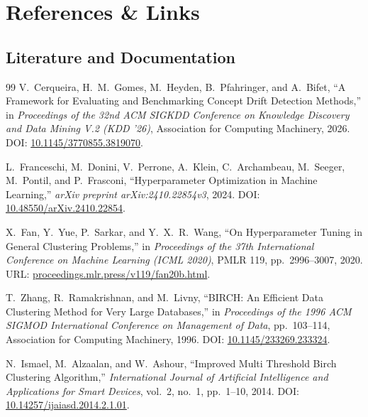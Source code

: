 \section{References \& Links}

\subsection*{Literature and Documentation}
\begin{thebibliography}{99}
\small
{}
V.~Cerqueira, H.~M.~Gomes, M.~Heyden, B.~Pfahringer, and A.~Bifet,
\newblock ``A Framework for Evaluating and Benchmarking Concept Drift Detection Methods,''
\newblock in \emph{Proceedings of the 32nd ACM SIGKDD Conference on Knowledge Discovery and Data Mining V.2 (KDD '26)}, Association for Computing Machinery, 2026.
\newblock DOI: \href{https://doi.org/10.1145/3770855.3819070}{10.1145/3770855.3819070}.

L.~Franceschi, M.~Donini, V.~Perrone, A.~Klein, C.~Archambeau, M.~Seeger, M.~Pontil, and P.~Frasconi,
\newblock ``Hyperparameter Optimization in Machine Learning,''
\newblock \emph{arXiv preprint arXiv:2410.22854v3}, 2024.
\newblock DOI: \href{https://doi.org/10.48550/arXiv.2410.22854}{10.48550/arXiv.2410.22854}.

X.~Fan, Y.~Yue, P.~Sarkar, and Y.~X.~R.~Wang,
\newblock ``On Hyperparameter Tuning in General Clustering Problems,''
\newblock in \emph{Proceedings of the 37th International Conference on Machine Learning (ICML 2020)}, PMLR 119, pp.~2996--3007, 2020.
\newblock URL: \href{https://proceedings.mlr.press/v119/fan20b.html}{proceedings.mlr.press/v119/fan20b.html}.

T.~Zhang, R.~Ramakrishnan, and M.~Livny,
\newblock ``BIRCH: An Efficient Data Clustering Method for Very Large Databases,''
\newblock in \emph{Proceedings of the 1996 ACM SIGMOD International Conference on Management of Data}, pp.~103--114, Association for Computing Machinery, 1996.
\newblock DOI: \href{https://doi.org/10.1145/233269.233324}{10.1145/233269.233324}.

N.~Ismael, M.~Alzaalan, and W.~Ashour,
\newblock ``Improved Multi Threshold Birch Clustering Algorithm,''
\newblock \emph{International Journal of Artificial Intelligence and Applications for Smart Devices}, vol.~2, no.~1, pp.~1--10, 2014.
\newblock DOI: \href{https://doi.org/10.14257/ijaiasd.2014.2.1.01}{10.14257/ijaiasd.2014.2.1.01}.


\end{thebibliography}
